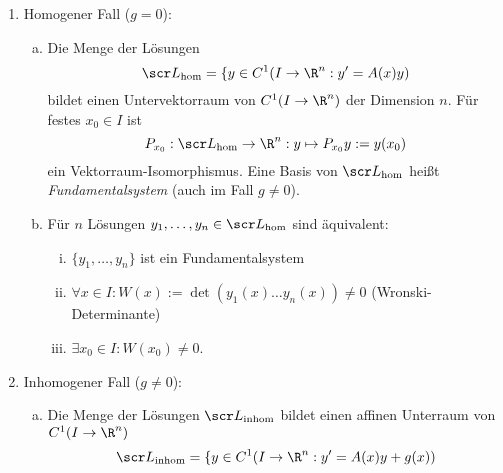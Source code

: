 \begin{st} \label{4.2}
	\begin{enumerate}[1)]
		\item
			Homogener Fall ($g = 0$):
			\begin{enumerate}[a)]
				\item
					Die Menge der Lösungen
					\[
						\scr L_{\text{hom}} = \{y \in C^1(I \to \R^n : y' = A(x)y)
					\]
					bildet einen Untervektorraum von $C^1(I \to \R^n)$ der Dimension $n$.
					Für festes $x_0 \in I$ ist
					\[
						P_{x_0} : \scr L_{\text{hom}} \to \R^n : y \mapsto P_{x_0} y := y(x_0)
					\]
					ein Vektorraum-Isomorphismus.
					Eine Basis von $\scr L_{\text{hom}}$ heißt \emph{Fundamentalsystem} (auch im Fall $g \neq 0$).
				\item
					Für $n$ Lösungen $y_1, \dotsc, y_n \in \scr L_{\text{hom}}$ sind äquivalent:
					\begin{enumerate}[(i)]
						\item
							$\{y_1,\dotsc,y_n\}$ ist ein Fundamentalsystem
						\item
							$\forall x \in I : W(x) := \det(y_1(x) \dotso y_n(x)) \neq 0$ (Wronski-Determinante)
						\item
							$\exists x_0 \in I : W(x_0) \neq 0$.
					\end{enumerate}
			\end{enumerate}
		\item
			Inhomogener Fall ($g \neq 0$):
			\begin{enumerate}[a)]
				\item
					Die Menge der Lösungen $\scr L_{\text{inhom}}$ bildet einen affinen Unterraum von $C^1(I \to \R^n)$
					\[
						\scr L_{\text{inhom}} = \{y \in C^1(I \to \R^n: y' = A(x)y + g(x))
					\]


\end{enumerate}
\end{enumerate}
\end{st}
